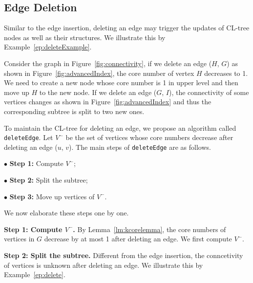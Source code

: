 \subsection{Edge Deletion}
\label{sec:edgeDeletion}

Similar to the edge insertion, deleting an edge may trigger the updates of CL-tree nodes as well as their structures. We illustrate this by Example~\ref{ep:deleteExample}.


\begin{example}
\label{ep:deleteExample}
Consider the graph in Figure~\ref{fig:connectivity}, if we delete an edge ($H$, $G$) as shown in Figure~\ref{fig:advancedIndex}, the core number of vertex $H$ decreases to 1. We need to create a new node whose core number is 1 in upper level and then move up $H$ to the new node. If we delete an edge ($G$, $I$), the connectivity of some vertices changes as shown in Figure~\ref{fig:advancedIndex} and thus the corresponding subtree is split to two new ones. 
\end{example}
To maintain the CL-tree for deleting an edge, we propose an algorithm called {\tt deleteEdge}.
Let $V^-$ be the set of vertices whose core numbers decrease after deleting an edge ($u$, $v$).
The main steps of {\tt deleteEdge} are as follows. 

$\bullet$ \textbf{Step 1:} Compute $V^-$;

$\bullet$ \textbf{Step 2:} Split the subtree;

$\bullet$ \textbf{Step 3:} Move up vertices of $V^-$.

We now elaborate these steps one by one.

\textbf{Step 1: Compute $V^-$.}
By Lemma~\ref{lm:kcorelemma}, the core numbers of vertices in $G$ decrease by at most 1 after deleting an edge. We first compute $V^-$.

\textbf{Step 2: Split the subtree.}
Different from the edge insertion, the conncetivity of vertices is unknown after deleting an edge. We illustrate this by Example~\ref{ep:delete}. 


